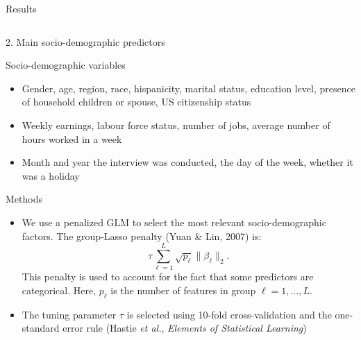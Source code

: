 \documentclass[final]{beamer}
\newcounter{acolumn}%
\def\autoheight{\vspace*{0pt}}%
\begin{document}
\begin{frame}
\begin{acolumns}[t]
\begin{column}{.72\linewidth}
\begin{block}{Results}
\begin{figure}
      \end{figure}
     
          
       
      \autoheight 
     \end{block}
     
                     
    \end{column}
              
    
    \begin{column}{.24\linewidth}
    \begin{center}
    	\LARGE{2. Main socio-demographic predictors}
    \end{center}
    
    \begin{block}{Socio-demographic variables}
                    \begin{itemize}
                    	\item Gender, age, region, race, hispanicity, marital status, education level, presence of household children or spouse, US citizenship status
                    	
                    	\item Weekly earnings, labour force status, number of jobs, average number of hours worked in a week
                    	
                    	\item Month and year the interview was conducted, the day of the week, whether it was a holiday
                    	
                    \end{itemize}
                                 
                    
                   \end{block}
                      
                  
    
     \begin{block}{Methods}
     	\begin{itemize}
     		\item We use a penalized GLM to select the most relevant socio-demographic factors. The group-Lasso penalty (Yuan \& Lin, 2007) is:
     		$$\tau \sum_{\ell=1}^{L}\sqrt{p_\ell}\|\beta_\ell\|_2.$$
     		This penalty is used to account for the fact that some predictors are categorical. Here, $p_\ell$ is the number of features in group $\ell=1,\ldots,L$.
     		\item The tuning parameter $\tau$ is selected using 10-fold cross-validation and the one-standard error rule (Hastie \emph{et al.}, \emph{Elements of Statistical Learning})
     	\end{itemize}
        

\end{block}
\end{column}
\end{acolumns}
\end{frame}
\end{document}
